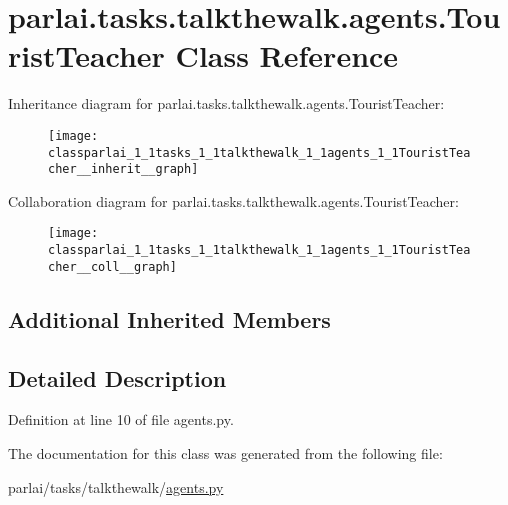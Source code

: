 \hypertarget{classparlai_1_1tasks_1_1talkthewalk_1_1agents_1_1TouristTeacher}{}\section{parlai.\+tasks.\+talkthewalk.\+agents.\+Tourist\+Teacher Class Reference}
\label{classparlai_1_1tasks_1_1talkthewalk_1_1agents_1_1TouristTeacher}


Inheritance diagram for parlai.\+tasks.\+talkthewalk.\+agents.\+Tourist\+Teacher\+:
\nopagebreak
\begin{figure}[H]
\begin{center}
\leavevmode
\texttt{[image: classparlai\_1\_1tasks\_1\_1talkthewalk\_1\_1agents\_1\_1TouristTeacher\_\_inherit\_\_graph]}
\end{center}
\end{figure}


Collaboration diagram for parlai.\+tasks.\+talkthewalk.\+agents.\+Tourist\+Teacher\+:
\nopagebreak
\begin{figure}[H]
\begin{center}
\leavevmode
\texttt{[image: classparlai\_1\_1tasks\_1\_1talkthewalk\_1\_1agents\_1\_1TouristTeacher\_\_coll\_\_graph]}
\end{center}
\end{figure}
\subsection*{Additional Inherited Members}


\subsection{Detailed Description}


Definition at line 10 of file agents.\+py.



The documentation for this class was generated from the following file\+:\begin{DoxyCompactItemize}
\item 
parlai/tasks/talkthewalk/\hyperlink{parlai_2tasks_2talkthewalk_2agents_8py}{agents.\+py}\end{DoxyCompactItemize}
